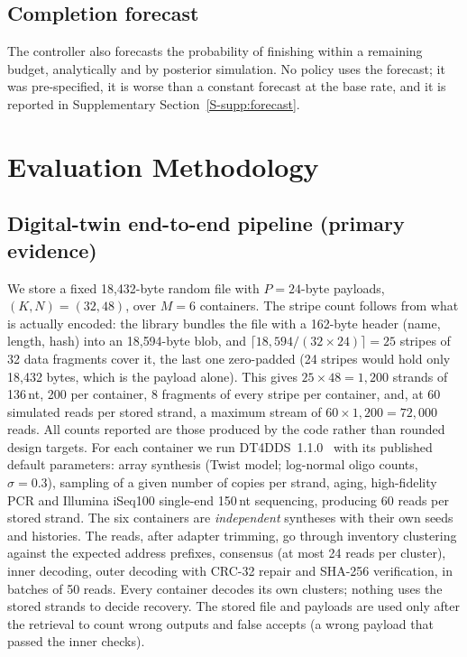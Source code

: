 \documentclass[conference,onecolumn,11pt]{IEEEtran}
\begin{document}
\subsection{Completion forecast}
The controller also forecasts the probability of finishing within a remaining budget, analytically and by
posterior simulation.  No policy uses the forecast; it was pre-specified, it is worse than a constant
forecast at the base rate, and it is reported in Supplementary Section~\ref{S-supp:forecast}.

\section{Evaluation Methodology}\label{sec:eval}
\subsection{Digital-twin end-to-end pipeline (primary evidence)}
We store a fixed 18{,}432-byte random file with $P{=}24$-byte payloads, $(K,N)=(32,48)$, over
$M{=}6$ containers.  The stripe count follows from what is actually encoded: the library bundles the
file with a 162-byte header (name, length, hash) into an 18{,}594-byte blob, and
$\lceil 18{,}594/(32\times24)\rceil=25$ stripes of 32 data fragments cover it, the last one
zero-padded (24 stripes would hold only 18{,}432 bytes, which is the payload alone).  This gives
$25\times48=1{,}200$ strands of 136\,nt, 200 per container, 8 fragments of every stripe per container,
and, at 60 simulated reads per stored strand, a maximum stream of $60\times1{,}200=72{,}000$ reads.
All counts reported are those produced by the code rather than rounded design targets.  For each
container we run
DT4DDS~1.1.0~\cite{gimpel2023digital} with its published default parameters: array synthesis
(Twist model; log-normal oligo counts, $\sigma{=}0.3$), sampling of a given number of copies
per strand, aging, high-fidelity PCR and Illumina iSeq100 single-end 150\,nt sequencing,
producing 60 reads per stored strand.  The six containers are \emph{independent} syntheses with
their own seeds and histories.  The reads, after adapter trimming, go through inventory
clustering against the expected address prefixes, consensus (at most 24 reads per cluster),
inner decoding, outer decoding with CRC-32 repair and SHA-256 verification, in batches of 50
reads.  Every container decodes its own clusters; nothing uses the stored strands to decide
recovery.  The stored file and payloads are used only after the retrieval to count wrong
outputs and false accepts (a wrong payload that passed the inner checks).
\end{document}
